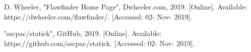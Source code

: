 \documentclass[journal]{IEEEtran}
\begin{document}

\begin{thebibliography}{00}

 D. Wheeler, "Flawfinder Home Page", Dwheeler.com, 2019. [Online]. Available:
https://dwheeler.com/flawfinder/. [Accessed: 02- Nov- 2019].

 "sscpac/statick", GitHub, 2019. [Online]. Available:
https://github.com/sscpac/statick. [Accessed: 02- Nov- 2019].

\end{thebibliography}
\end{document}
